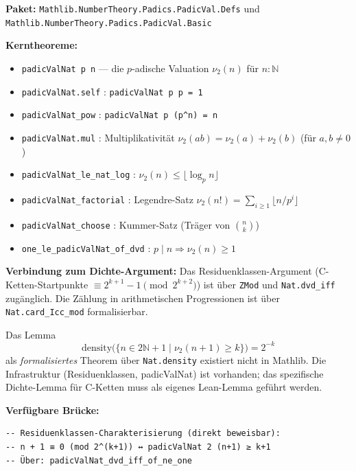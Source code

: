 \documentclass[12pt,a4paper]{article}
\newcommand{\vii}{\nu_2}
\newcommand{\N}{\mathbb{N}}
\newcommand{\Mathlib}[1]{\texttt{Mathlib.\allowbreak #1}}
\begin{document}
\begin{tcolorbox}[vorhanden,
  title={Formalisiert: 2-adische Valuation in Mathlib}]
\textbf{Paket:} \Mathlib{NumberTheory.Padics.PadicVal.Defs} und
\Mathlib{NumberTheory.Padics.PadicVal.Basic}

\medskip
\textbf{Kerntheoreme:}
\begin{itemize}[nosep]
  \item \texttt{padicValNat p n} --- die $p$-adische Valuation $\vii(n)$ für $n:\N$
  \item \texttt{padicValNat.self} : \texttt{padicValNat p p = 1}
  \item \texttt{padicValNat\_pow} : \texttt{padicValNat p (p\^{}n) = n}
  \item \texttt{padicValNat.mul} : Multiplikativität $\vii(ab) = \vii(a)+\vii(b)$ (für $a,b\neq 0$)
  \item \texttt{padicValNat\_le\_nat\_log} : $\vii(n) \leq \lfloor\log_p n\rfloor$
  \item \texttt{padicValNat\_factorial} : Legendre-Satz $\vii(n!) = \sum_{i\geq 1}\lfloor n/p^i\rfloor$
  \item \texttt{padicValNat\_choose} : Kummer-Satz (Träger von $\binom{n}{k}$)
  \item \texttt{one\_le\_padicValNat\_of\_dvd} : $p\mid n \Rightarrow \vii(n)\geq 1$
\end{itemize}

\medskip
\textbf{Verbindung zum Dichte-Argument:} Das Residuenklassen-Argument
(C-Ketten-Startpunkte $\equiv 2^{k+1}-1 \pmod{2^{k+2}}$) ist über
\texttt{ZMod} und \texttt{Nat.dvd\_iff} zugänglich.
Die Zählung in arithmetischen Progressionen ist über
\texttt{Nat.card\_Icc\_mod} formalisierbar.
\end{tcolorbox}

\begin{tcolorbox}[lücke, title={Fehlt: Collatz-spezifisches Dichte-Lemma}]
Das Lemma
\[
  \mathrm{density}\bigl(\{n \in 2\N+1 \mid \vii(n+1) \geq k\}\bigr) = 2^{-k}
\]
als \emph{formalisiertes} Theorem über \texttt{Nat.density} existiert nicht in Mathlib.
Die Infrastruktur (Residuenklassen, padicValNat) ist vorhanden; das spezifische
Dichte-Lemma für C-Ketten muss als eigenes Lean-Lemma geführt werden.

\textbf{Verfügbare Brücke:}
\begin{lstlisting}[language=Lean4]
-- Residuenklassen-Charakterisierung (direkt beweisbar):
-- n + 1 ≡ 0 (mod 2^(k+1)) ↔ padicValNat 2 (n+1) ≥ k+1
-- Über: padicValNat_dvd_iff_of_ne_one
\end{lstlisting}
\end{tcolorbox}
\end{document}
